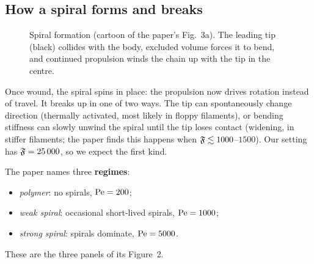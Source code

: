 \documentclass[11pt]{article}
\begin{document}
\subsection{How a spiral forms and breaks}
\begin{figure}[H]\centering
{}
\caption{Spiral formation (cartoon of the paper's Fig.~3a). The leading tip (black) collides with the body, excluded volume forces it to bend, and continued propulsion winds the chain up with the tip in the centre.}
\label{fig:formation}
\end{figure}
Once wound, the spiral spins in place: the propulsion now drives rotation instead of travel. It breaks up in one of two ways. The tip can spontaneously change direction
(thermally activated, most likely in floppy filaments), or bending stiffness can slowly unwind the spiral until the tip loses contact (widening, in stiffer filaments;
the paper finds this happens when $\mathfrak{F}\lesssim1000$--$1500$). Our setting has $\mathfrak{F}=25\,000$, so we expect the first kind.

The paper names three \textbf{regimes}:
\begin{itemize}
\item \emph{polymer}: no spirals, $\mathrm{Pe}=200$;
\item \emph{weak spiral}: occasional short-lived spirals, $\mathrm{Pe}=1000$;
\item \emph{strong spiral}: spirals dominate, $\mathrm{Pe}=5000$.
\end{itemize}
These are the three panels of its Figure~2.
\end{document}
